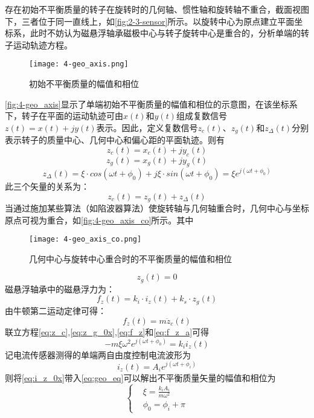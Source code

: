 \documentclass[
  lang=cn,
  degree=master,
  openany,oneside
]{nuaathesis}
\begin{document}
存在初始不平衡质量的转子在旋转时的几何轴、惯性轴和旋转轴不重合，截面视图下，三者位于同一直线上，如\autoref{fig:2-3-sensor}所示。以旋转中心为原点建立平面坐标系，此时不妨认为磁悬浮轴承磁极中心与转子旋转中心是重合的，分析单端的转子运动轨迹方程。
\begin{figure}
	\texttt{[image: 4-geo\_axis.png]}
	\caption{初始不平衡质量的幅值和相位}
	\label{fig:4-geo_axis}
\end{figure}
\autoref{fig:4-geo_axis}显示了单端初始不平衡质量的幅值和相位的示意图，在该坐标系下，转子在平面的运动轨迹可由$x(t)$和$y(t)$组成复数信号$z(t) = x(t) + jy(t)$表示。因此，定义复数信号$z_c(t)$、$z_g(t)$和$z_{\Delta}(t)$分别表示转子的质量中心、几何中心和偏心距的平面轨迹。则有
\begin{equation}
z_c(t) = x_c(t) + jy_c(t)
\end{equation}
\begin{equation}
z_g(t) = x_g(t) + jy_g(t)
\end{equation}
\begin{equation}
\label{eq:z_delta}
z_{\Delta}(t) = \xi \cdot cos(\omega t+\phi _0) + j\xi \cdot sin(\omega t + \phi _0) = \xi e^{j(\omega t + \phi _0)}
\end{equation}
此三个矢量的关系为：
\begin{equation}
	\label{eq:z_c}
	z_c(t) = z_g(t) + z_{\Delta}(t)
\end{equation}
当通过施加某些算法（如陷波器算法）使旋转轴与几何轴重合时，几何中心与坐标原点可视为重合，如\autoref{fig:4-geo_axis_co}所示。其中
\begin{figure}
	\texttt{[image: 4-geo\_axis\_co.png]}
	\caption{几何中心与旋转中心重合时的不平衡质量的幅值和相位}
	\label{fig:4-geo_axis_co}
\end{figure}
\begin{equation}
	\label{eq:z_g_0x}
	z_g(t) = 0
\end{equation}
磁悬浮轴承中的磁悬浮力为：
\begin{equation}
	\label{eq:f_z}
	f_z(t) = k_i \cdot i_z(t) + k_s \cdot z_g(t)
\end{equation}
由牛顿第二运动定律可得：
\begin{equation}
	\label{eq:f_z_a}
	f_z(t) = m{\ddot{z}}_c(t)
\end{equation}
联立方程\autoref{eq:z_c},\autoref{eq:z_g_0x},\autoref{eq:f_z}和\autoref{eq:f_z_a}可得
\begin{equation}
	\label{eq:geo_eq}
	-m \xi {\omega}^2e^{j(\omega t + \phi _0)} = k_ii_z(t)
\end{equation}
记电流传感器测得的单端两自由度控制电流波形为
\begin{equation}
	\label{eq:i_z_0x}
	i_z(t) = A_ie^{j(\omega t + \phi _i)}
\end{equation}
则将\autoref{eq:i_z_0x}带入\autoref{eq:geo_eq}可以解出不平衡质量矢量的幅值和相位为
\begin{equation}
\left\{
\begin{aligned}
& \xi = \frac{k_iA_i}{m{\omega}^2}\\
& \phi _0 = \phi _i + \pi
\end{aligned}
\right.
\end{equation}
\end{document}
